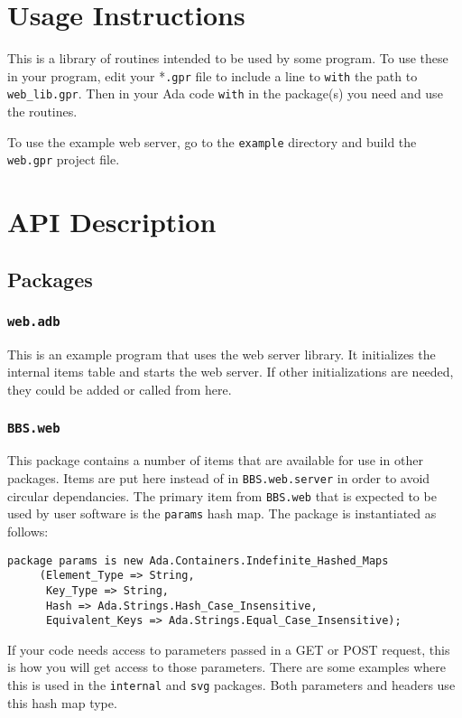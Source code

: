 \documentclass[10pt, openany]{book}
\newcommand{\package}[1]{\texttt{#1}}
\newcommand{\keyword}[1]{\texttt{#1}}
\newcommand{\datatype}[1]{\texttt{#1}}
\begin{document}
\chapter{Usage Instructions}
This is a library of routines intended to be used by some program.  To use these in your program, edit your *\keyword{.gpr} file to include a line to \keyword{with} the path to \keyword{web\_lib.gpr}.  Then in your Ada code \keyword{with} in the package(s) you need and use the routines.

To use the example web server, go to the \keyword{example} directory and build the \keyword{web.gpr} project file.

\chapter{API Description}
\section{Packages}
\subsection{\package{web.adb}}
This is an example program that uses the web server library.  It initializes the internal items table and starts the web server.  If other initializations are needed, they could be added or called from here.

\subsection{\package{BBS.web}}
This package contains a number of items that are available for use in other packages.  Items are put here instead of in \package{BBS.web.server} in order to avoid circular dependancies.  The primary item from \package{BBS.web} that is expected to be used by user software is the \datatype{params} hash map.  The package is instantiated as follows:
\begin{lstlisting}
package params is new Ada.Containers.Indefinite_Hashed_Maps
     (Element_Type => String,
      Key_Type => String,
      Hash => Ada.Strings.Hash_Case_Insensitive,
      Equivalent_Keys => Ada.Strings.Equal_Case_Insensitive);
\end{lstlisting}
If your code needs access to parameters passed in a GET or POST request, this is how you will get access to those parameters.  There are some examples where this is used in the \package{internal} and \package{svg} packages.  Both parameters and headers use this hash map type.
\end{document}
